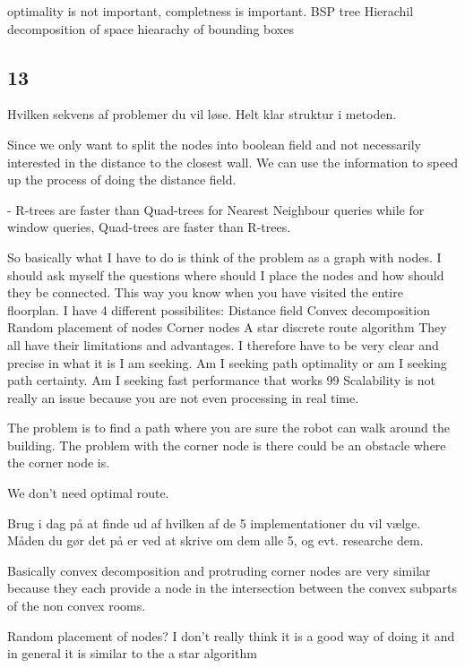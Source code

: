optimality is not important, completness is important.
BSP tree
Hierachil decomposition of space
hiearachy of bounding boxes


\subsection{13}
Hvilken sekvens af problemer du vil løse.
Helt klar struktur i metoden.

Since we only want to split the nodes into boolean field and not necessarily interested in the distance to the closest wall. 
We can use the information to speed up the process of doing the distance field.



- R-trees are faster than Quad-trees for Nearest Neighbour queries while for window queries, Quad-trees are faster than R-trees.



So basically what I have to do is think of the problem as a graph with nodes. I should ask myself the questions where should I place the nodes and how should they be connected.
This way you know when you have visited the entire floorplan.
I have 4 different possibilites:
Distance field
Convex decomposition
Random placement of nodes
Corner nodes
A star discrete route algorithm
They all have their limitations and advantages. 
I therefore have to be very clear and precise in what it is I am seeking. 
Am I seeking path optimality or am I seeking path certainty.
Am I seeking fast performance that works 99%
Scalability is not really an issue because you are not even processing in real time.

The problem is to find a path where you are sure the robot can walk around the building.
The problem with the corner node is there could be an obstacle where the corner node is.

We don't need optimal route.

Brug i dag på at finde ud af hvilken af de 5 implementationer du vil vælge. 
Måden du gør det på er ved at skrive om dem alle 5, og evt. researche dem.

Basically convex decomposition and protruding corner nodes are very similar because they each provide a node in the intersection 
between the convex subparts of the non convex rooms.

Random placement of nodes?
I don't really think it is a good way of doing it and in general it is similar to the a star algorithm


